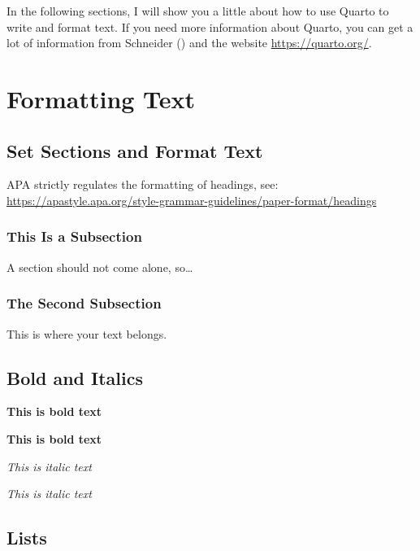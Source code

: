 \documentclass[
  stu,
  floatsintext,
  longtable,
  a4paper,
  nolmodern,
  notxfonts,
  notimes,
  colorlinks=true,linkcolor=black,citecolor=black,urlcolor=black]{apa7}
\begin{document}
In the following sections, I will show you a little about how to use
Quarto to write and format text. If you need more information about
Quarto, you can get a lot of information from Schneider
() and the website
\url{https://quarto.org/}.

\section{Formatting Text}\label{formatting-text}

\subsection{Set Sections and Format
Text}\label{set-sections-and-format-text}

APA strictly regulates the formatting of headings, see:
\url{https://apastyle.apa.org/style-grammar-guidelines/paper-format/headings}

\subsubsection{This Is a Subsection}\label{this-is-a-subsection}

A section should not come alone, so\ldots{}

\subsubsection{The Second Subsection}\label{the-second-subsection}

This is where your text belongs.

\subsection{Bold and Italics}\label{bold-and-italics}

\textbf{This is bold text}

\textbf{This is bold text}

\emph{This is italic text}

\emph{This is italic text}

\subsection{Lists}\label{lists}
\end{document}
